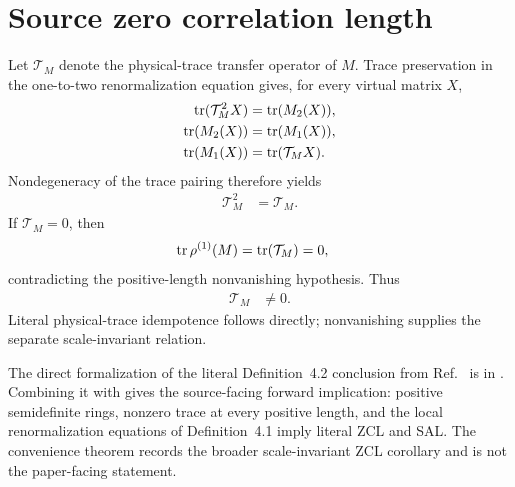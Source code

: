 \documentclass{article}
\begin{document}
\section{Source zero correlation length}

Let $\mathcal T_M$ denote the physical-trace transfer operator of $M$. Trace
preservation in the one-to-two renormalization equation gives, for every
virtual matrix $X$,
\begin{align}
    \operatorname{tr}(\mathcal T_M^2X)
        &=
        \operatorname{tr}(M_2(X)),
    \label{eq:cpsv16_rfp_sal_data_processing_transfer_trace_length_two}\\
    \operatorname{tr}(M_2(X))
        &=
        \operatorname{tr}(M_1(X)),
    \label{eq:cpsv16_rfp_sal_data_processing_renormalization_trace_equality}\\
    \operatorname{tr}(M_1(X))
        &=
        \operatorname{tr}(\mathcal T_MX).
    \label{eq:cpsv16_rfp_sal_data_processing_transfer_trace_length_one}
\end{align}
Nondegeneracy of the trace pairing therefore yields
\begin{align}
    \mathcal T_M^2
        &=
        \mathcal T_M.
    \label{eq:cpsv16_rfp_sal_data_processing_physical_trace_idempotence}
\end{align}
If $\mathcal T_M=0$, then
\begin{align}
    \operatorname{tr}\rho^{(1)}(M)
        &=
        \operatorname{tr}(\mathcal T_M)
        =
        0,
    \label{eq:cpsv16_rfp_sal_data_processing_zero_transfer_trace}
\end{align}
contradicting the positive-length nonvanishing hypothesis. Thus
\begin{align}
    \mathcal T_M
        &\ne
        0.
    \label{eq:cpsv16_rfp_sal_data_processing_nonzero_transfer}
\end{align}
Literal physical-trace idempotence follows directly; nonvanishing supplies the
separate scale-invariant relation.

The direct formalization of the literal Definition~4.2 conclusion from
Ref.~\cite{Cirac2016MPDO_arXiv} is
 in
. Combining it with
 gives the source-facing
forward implication: positive semidefinite rings, nonzero trace at every
positive length, and the local renormalization equations of Definition~4.1
imply literal ZCL and SAL. The convenience theorem
records the broader scale-invariant ZCL corollary and is not the paper-facing
statement.
\end{document}
